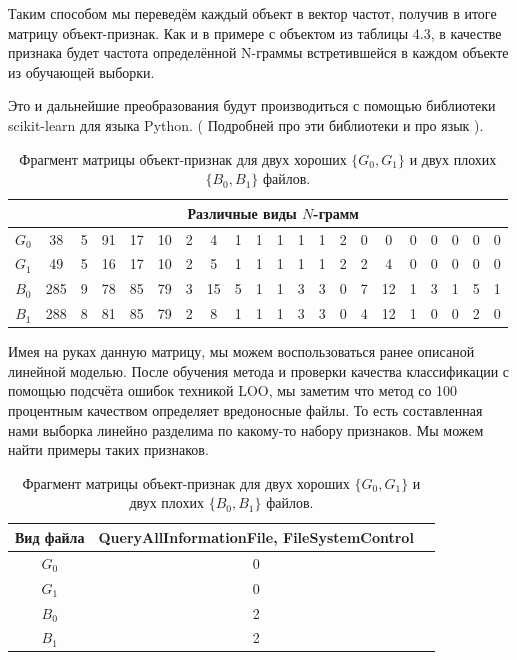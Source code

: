 Таким способом мы переведём каждый объект в вектор частот, получив в итоге матрицу объект-признак.
Как и в примере с объектом из таблицы 4.3, в качестве признака будет частота определённой N-граммы встретившейся в каждом объекте из обучающей выборки.

Это и дальнейшие преобразования будут производиться с помощью библиотеки scikit-learn для языка Python. ( Подробней про эти библиотеки и про язык ).

\bgroup
\def\arraystretch{1.5}%
\begin{table}[ht]
\caption{Фрагмент матрицы объект-признак для двух хороших $\{G_0, G_1\}$ и двух плохих $\{B_0, B_1\}$ файлов.}
\label{tab_weight}
\centering
    \begin{tabular}{|c|c|c|c|c|c|c|c|c|c|c|c|c|c|c|c|c|c|c|c|c|}
    \hline & \multicolumn{20}{c|}{Различные виды $N$-грамм} \\
    \hline $G_0$ & 38 & 5 & 91 & 17 & 10 & 2 & 4 & 1 & 1 & 1 & 1 & 1 & 2 & 0 & 0 & 0 & 0 & 0 & 0 & 0 \\
 	\hline $G_1$ & 49 & 5 & 16 & 17 & 10 & 2 & 5 & 1 & 1 & 1 & 1 & 1 & 2 & 2 & 4 & 0 & 0 & 0 & 0 & 0 \\
 	\hline $B_0$ & 285 & 9 & 78 & 85 & 79 & 3 & 15 & 5 & 1 & 1 & 3 & 3 & 0 & 7 & 12 & 1 & 3 & 1 & 5 & 1 \\
 	\hline $B_1$ & 288 & 8 & 81 & 85 & 79 & 2 & 8 & 1 & 1 & 1 & 3 & 3 & 0 & 4 & 12 & 1 & 0 & 0 & 2 & 0 \\
	\hline
    \end{tabular}
\end{table}
\egroup

Имея на руках данную матрицу, мы можем воспользоваться ранее описаной линейной моделью. После обучения метода и проверки качества классификации с помощью подсчёта ошибок техникой LOO, мы заметим что метод со 100 процентным качеством определяет вредоносные файлы. То есть составленная нами выборка линейно разделима по какому-то набору признаков. Мы можем найти примеры таких признаков.

\bgroup
\def\arraystretch{1.5}%
\begin{table}[ht]
\caption{Фрагмент матрицы объект-признак для двух хороших $\{G_0, G_1\}$ и двух плохих $\{B_0, B_1\}$ файлов.}
\label{tab_weight}
\centering
    \begin{tabular}{|c|c|c|}
    \hline Вид файла & QueryAllInformationFile, FileSystemControl \\
    \hline $G_0$ & 0 \\
 	\hline $G_1$ & 0 \\
 	\hline $B_0$ & 2 \\
 	\hline $B_1$ & 2 \\
	\hline
    \end{tabular}
\end{table}
\egroup

